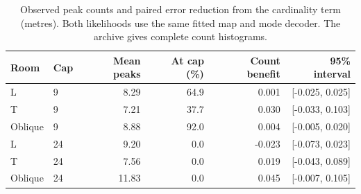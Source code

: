 \begin{table}[H]
\centering
\caption{Observed peak counts and paired error reduction from the cardinality term (metres). Both likelihoods use the same fitted map and mode decoder. The archive gives complete count histograms.}
\label{tab:counts}
\setlength{\tabcolsep}{4pt}
\begin{tabular}{llrrrr}
\toprule
Room & Cap & Mean peaks & At cap (\%) & Count benefit & 95\% interval\\
\midrule
L & 9 & 8.29 & 64.9 & 0.001 & [-0.025, 0.025]\\
T & 9 & 7.21 & 37.7 & 0.030 & [-0.033, 0.103]\\
Oblique & 9 & 8.88 & 92.0 & 0.004 & [-0.005, 0.020]\\
L & 24 & 9.20 & 0.0 & -0.023 & [-0.073, 0.023]\\
T & 24 & 7.56 & 0.0 & 0.019 & [-0.043, 0.089]\\
Oblique & 24 & 11.83 & 0.0 & 0.045 & [-0.007, 0.105]\\
\bottomrule
\end{tabular}
\end{table}
